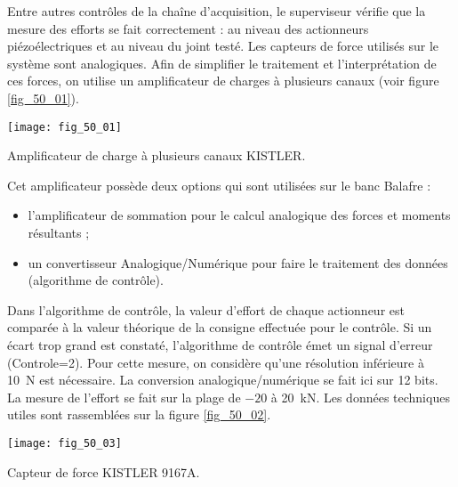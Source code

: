\normaltrue \difficilefalse \tdifficilefalse
\correctionfalse

\setcounter{question}{0}
\ifcorrection
\else
{}
\fi

\ifprof
\else


Entre autres contrôles de la chaîne d’acquisition, le superviseur vérifie que la mesure des efforts se fait correctement : au niveau des actionneurs piézoélectriques et au niveau du joint testé. Les capteurs de force utilisés sur le système sont analogiques. Afin de simplifier le traitement et l’interprétation de ces forces, on utilise un amplificateur de charges à plusieurs canaux (voir figure \ref{fig_50_01}).


\begin{marginfigure}
\centering
\texttt{[image: fig\_50\_01]}
\caption{Amplificateur de charge à plusieurs canaux KISTLER. \label{fig_50_01}}
\end{marginfigure}



Cet amplificateur possède deux options qui sont utilisées sur le banc Balafre :
\begin{itemize}
\item l’amplificateur de sommation pour le calcul analogique des forces et moments résultants
;
\item un convertisseur Analogique/Numérique pour faire le traitement des données (algorithme
de contrôle).
\end{itemize}
Dans l’algorithme de contrôle, la valeur d’effort de chaque actionneur est comparée à
la valeur théorique de la consigne effectuée pour le contrôle. Si un écart trop grand est
constaté, l’algorithme de contrôle émet un signal d’erreur (Controle=2). Pour cette mesure,
on considère qu’une résolution inférieure à  \SI{10}{N} est nécessaire.
La conversion analogique/numérique se fait ici sur 12 bits. La mesure de l’effort se fait
sur la plage de $-20$ à \SI{20}{kN}. Les données techniques utiles sont rassemblées sur la figure
\ref{fig_50_02}.

\begin{marginfigure}
\centering
\texttt{[image: fig\_50\_03]}
\caption{Capteur de force KISTLER 9167A. \label{fig_50_03}}
\end{marginfigure}

